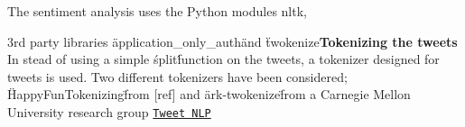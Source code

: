 \documentclass[Main]{subfiles}
\begin{document}



The sentiment analysis uses the Python modules nltk, 

3rd party libraries \"application_only_auth\" and \"twokenize\"



\textbf{Tokenizing the tweets}
In stead of using a simple \'split\' function on the tweets, a tokenizer designed for tweets is used. Two different tokenizers have been considered; \"HappyFunTokenizing\" from [ref] and \"ark-twokenize\" from a Carnegie Mellon University research group \href{http://www.ark.cs.cmu.edu/TweetNLP/}{\tt Tweet NLP}
\end{document}
